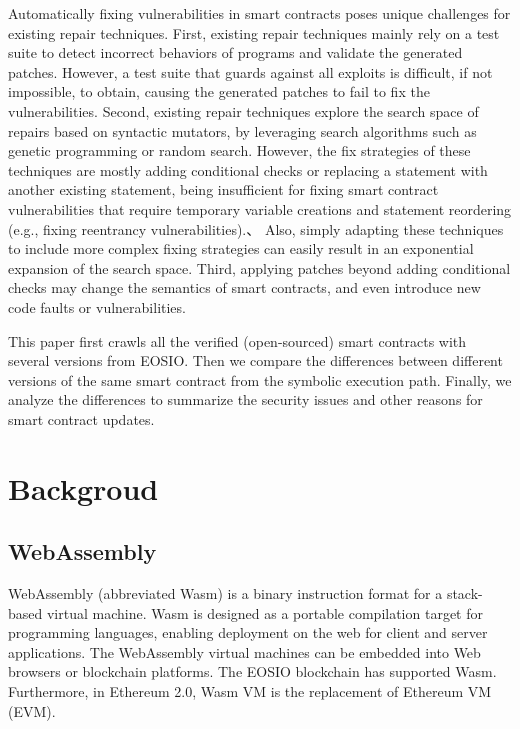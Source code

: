 \documentclass[a4paper, 10pt, conference, twocolumn]{ieeeconf}       %
\begin{document}
Automatically fixing vulnerabilities in smart contracts poses unique challenges for existing repair techniques. 
First, existing repair techniques mainly rely on a test suite to detect incorrect behaviors of programs and validate the generated patches.
However, a test suite that guards against all exploits is difficult, if not impossible, to obtain, causing the generated patches to fail to fix the vulnerabilities.
Second, existing repair techniques explore the search space of repairs based on syntactic mutators, by leveraging search algorithms such as genetic programming or random search.
However, the fix strategies of these techniques are mostly adding conditional checks or replacing a statement with another existing statement, being insufficient for fixing smart contract vulnerabilities that require temporary variable creations and statement reordering (e.g., fixing reentrancy vulnerabilities).、
Also, simply adapting these techniques to include more complex fixing strategies can easily result in an exponential expansion of the search space.
Third, applying patches beyond adding conditional checks may change the semantics of smart contracts, and even introduce new code faults or vulnerabilities.

This paper first crawls all the verified (open-sourced) smart contracts with several versions from EOSIO.
Then we compare the differences between different versions of the same smart contract from the symbolic execution path.
Finally, we analyze the differences to summarize the security issues and other reasons for smart contract updates.

\section{Backgroud}


\subsection{WebAssembly}

WebAssembly (abbreviated Wasm) is a binary instruction format for a stack-based virtual machine.
Wasm is designed as a portable compilation target for programming languages, enabling deployment on the web for client and server applications\cite{webassembly}.
The WebAssembly virtual machines can be embedded into Web browsers or blockchain platforms. The EOSIO blockchain has supported Wasm.
Furthermore, in Ethereum 2.0, Wasm VM is the replacement of Ethereum VM (EVM).
\end{document}
